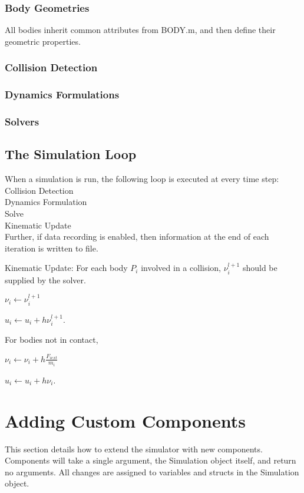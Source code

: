 \documentclass{article}
\newcommand{\tab}{\hspace*{2em}}
\begin{document}
\subsubsection{Body Geometries}
All bodies inherit common attributes from BODY.m, and then define their geometric properties.  
\subsubsection{Collision Detection}
\subsubsection{Dynamics Formulations}
\subsubsection{Solvers} 

\subsection{The Simulation Loop}
When a simulation is run, the following loop is executed at every time step: \\
\tab Collision Detection \\ 	%
\tab Dynamics Formulation \\
\tab Solve \\
\tab Kinematic Update \\
Further, if data recording is enabled, then information at the end of each iteration is written to file. 

Kinematic Update:  
For each body $P_{i}$ involved in a collision, $\nu_{i}^{l+1}$ should be supplied by the solver.
\begin{center}
$
\nu_{i} \gets \nu_{i}^{l+1}    \nonumber
$ 

$
u_{i} \gets u_{i} + h \nu_{i}^{l+1}   \nonumber
$. 
\end{center}
For bodies not in contact, 
\begin{center}
$
\nu_{i} \gets \nu_{i} + h \frac{F_{i ext}}{m_{i}}
$

$
u_{i} \gets u_{i} + h \nu_{i}
$.
\end{center}

\section{Adding Custom Components}
\label{sec:customComponents}
This section details how to extend the simulator with new components.  Components will take a single argument, the Simulation object itself, and return no arguments.  All changes are assigned to variables and structs in the Simulation object.  
\end{document}

